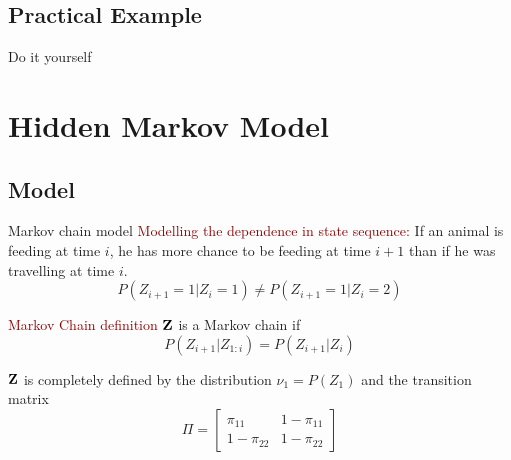 \documentclass{beamer}\usepackage[]{graphicx}\usepackage[]{color}
\newcommand{\emphase}[1]{\textcolor{darkred}{#1}}
\newcommand{\paragraph}[1]{\emphase{#1}}
\newcommand{\Zbf}{{\bf Z}}
\begin{document}
\subsection*{Practical Example}
\begin{frame}[fragile]{Do it yourself}
\end{frame}
\section{Hidden Markov Model}

\subsection*{Model}
\begin{frame}{Markov chain model}
\paragraph{Modelling the dependence in state sequence:}
If an animal is feeding at time $i$, he has more chance to be feeding at time $i+1$ than if he was travelling at time $i$.
$$P(Z_{i+1}=1 \vert Z_{i}=1) \ne P(Z_{i+1}=1 \vert Z_{i}=2)$$

\paragraph{Markov Chain definition}
$\Zbf$ is a Markov chain if 
$$P(Z_{i+1} \vert Z_{1:i}) =  P(Z_{i+1} \vert Z_{i})$$


$\Zbf$ is completely defined by the distribution $\nu_1=P(Z_1)$ and the transition matrix
$$\Pi =\left[\begin{matrix}
\pi_{11} & 1-\pi_{11}\\
1-\pi_{22} & 1-\pi_{22}
\end{matrix}\right]$$
\end{frame}
\end{document}
